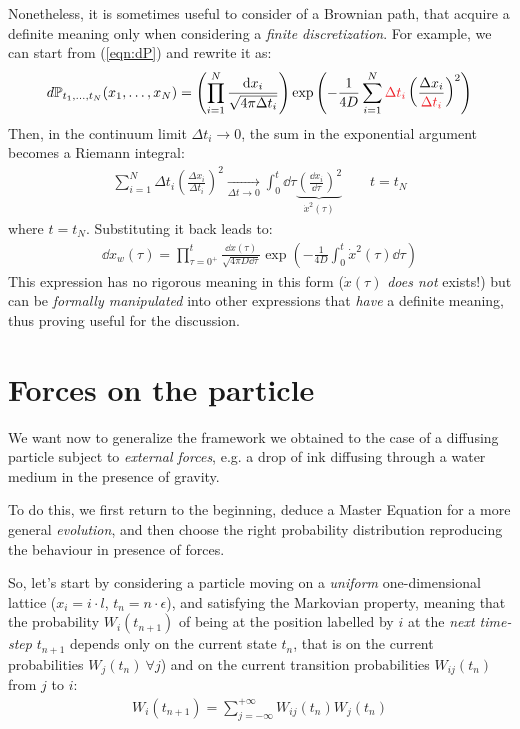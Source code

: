 \documentclass[../template.tex]{subfiles}
\begin{document}
\medskip

Nonetheless, it is sometimes useful to consider  of a Brownian path, that acquire a definite meaning only when considering a \textit{finite discretization}. For example, we can start from (\ref{eqn:dP}) and rewrite it as:
\begin{align*}
    d\mathbb{P}_{t_1, \dots, t_N} (x_1, \dots, x_N) = \left(\prod_{i=1}^N \frac{\dd{x_i}}{\sqrt{4 \pi \Delta t_i }}\right) \exp\left(-\frac{1}{4 D} \sum_{i=1}^N \textcolor{Red}{\Delta t_i} \left(\frac{\Delta x_i}{\textcolor{Red}{\Delta t_i}} \right)^2 \right) 
\end{align*}
Then, in the continuum limit $\Delta t_i \to 0$, the sum in the exponential argument becomes a Riemann integral:
\begin{align*}
    \sum_{i=1}^N \Delta t_i \left(\frac{\Delta x_i}{\Delta t_i} \right)^2 \xrightarrow[\Delta t \to 0]{} \int_0^t \dd{\tau} \underbrace{\left(\frac{\dd{x_i}}{\dd{\tau}} \right)^2}_{\dot{x}^2(\tau)}  \qquad t= t_N
\end{align*} 
where $t = t_N$. Substituting it back leads to:
\begin{align*}
    \dd{x_w}(\tau) = \prod_{\tau = 0^+}^t \frac{\dd{x}(\tau)}{\sqrt{4 \pi D \dd{\tau}}} \exp\left(-\frac{1}{4 D} \int_0^t \dot{x}^2 (\tau) \dd{\tau} \right) 
\end{align*}
This expression has no rigorous meaning in this form ($\dot{x}(\tau)$  \textit{does not} exists!) but can be \textit{formally manipulated} into other expressions that \textit{have} a definite meaning, thus proving useful for the discussion.  

\section{Forces on the particle}
We want now to generalize the framework we obtained to the case of a diffusing particle subject to \textit{external forces}, e.g. a drop of ink diffusing through a water medium in the presence of gravity.

To do this, we first return to the beginning, deduce a Master Equation for a more general \textit{evolution}, and then choose the right probability distribution reproducing the behaviour in presence of forces.

So, let's start by considering a particle moving on a \textit{uniform} one-dimensional lattice ($x_i = i \cdot l$, $t_n = n \cdot \epsilon$), and satisfying the Markovian property, meaning that the probability $W_i(t_{n+1})$ of being at the position labelled by $i$ at the \textit{next time-step} $t_{n+1}$ depends only on the current state $t_n$, that is on the current probabilities $W_j(t_n) \> \forall j$) and on the current transition probabilities $W_{ij}(t_n)$ from $j$ to $i$:
\begin{align}\label{eqn:Markov1}
    W_i(t_{n+1}) = \sum_{j=-\infty}^{+\infty} W_{ij}(t_n) W_j(t_n)
\end{align}
\end{document}
